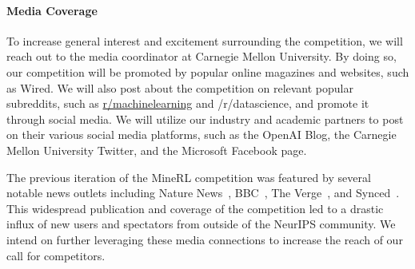 \paragraph{Media Coverage}
To increase general interest and excitement surrounding the competition, we will reach out to the media coordinator at Carnegie Mellon University.
By doing so, our competition will be promoted by popular online magazines and websites, such as Wired. 
We will also post about the competition on relevant popular subreddits, such as \url{r/machinelearning} and /r/datascience, and promote it through social media. 
We will utilize our industry and academic partners to post on their various social media platforms, such as the OpenAI Blog, the Carnegie Mellon University Twitter, and the Microsoft Facebook page.

The previous iteration of the MineRL competition was featured by several notable news outlets including Nature News~\cite{hsu_2019}, BBC~\cite{shead_2019}, The Verge~\cite{vincent_2019}, and Synced~\cite{synced_2019}. This widespread publication and coverage of the competition led to a drastic influx of new users and spectators from outside of the NeurIPS community. We intend on further leveraging these media connections to increase the reach of our call for competitors. 